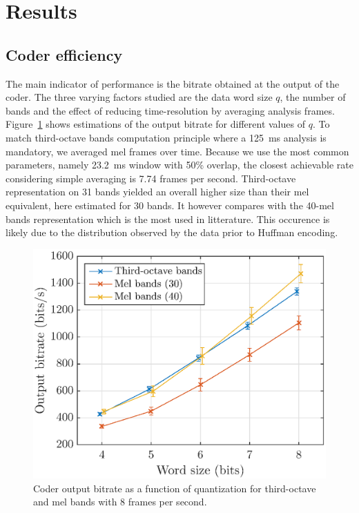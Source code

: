 \documentclass[final,3p,times,twocolumn]{elsarticle}
\begin{document}
\section{Results}

\subsection{Coder efficiency}
The main indicator of performance is the bitrate obtained at the output of the coder. The three varying factors studied are the data word size $q$, the number of bands and the effect of reducing time-resolution by averaging analysis frames. Figure~\ref{fig:bitrate_q} shows estimations of the output bitrate for different values of $q$. To match third-octave bands computation principle where a 125~ms analysis is mandatory, we averaged mel frames over time. Because we use the most common parameters, namely 23.2~ms window with 50\% overlap, the closest achievable rate considering simple averaging is 7.74 frames per second. Third-octave representation on 31 bands yielded an overall higher size than their mel equivalent, here estimated for 30 bands. It however compares with the 40-mel bands representation which is the most used in litterature. This occurence is likely due to the distribution observed by the data prior to Huffman encoding.

\begin{figure}[htbp]
	\centering
		\includegraphics[width=\columnwidth]{bitrate_qall.eps}
	\caption{Coder output bitrate as a function of quantization for third-octave and mel bands with 8 frames per second.}
	\label{fig:bitrate_q}
\end{figure}
\end{document}
